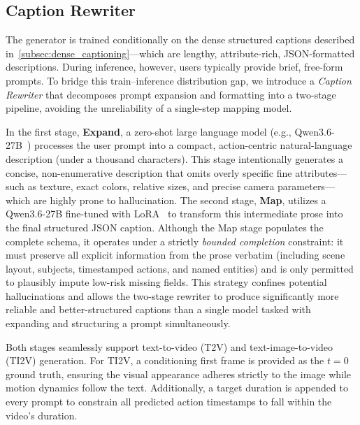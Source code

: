 \subsection{Caption Rewriter} \label{subsec:caption_rewriter}
The generator is trained conditionally on the dense structured captions described in~\cref{subsec:dense_captioning}---which are lengthy, attribute-rich, JSON-formatted descriptions. During inference, however, users typically provide brief, free-form prompts. To bridge this train--inference distribution gap, we introduce a \emph{Caption Rewriter} that decomposes prompt expansion and formatting into a two-stage pipeline, avoiding the unreliability of a single-step mapping model.

In the first stage, \textbf{Expand}, a zero-shot large language model (e.g., Qwen3.6-27B~\cite{qwen3.6-27b}) processes the user prompt into a compact, action-centric natural-language description (under a thousand characters). This stage intentionally generates a concise, non-enumerative description that omits overly specific fine attributes---such as texture, exact colors, relative sizes, and precise camera parameters---which are highly prone to hallucination. The second stage, \textbf{Map}, utilizes a Qwen3.6-27B fine-tuned with LoRA~\cite{hu2021lora} to transform this intermediate prose into the final structured JSON caption. Although the Map stage populates the complete schema, it operates under a strictly \emph{bounded completion} constraint: it must preserve all explicit information from the prose verbatim (including scene layout, subjects, timestamped actions, and named entities) and is only permitted to plausibly impute low-risk missing fields. This strategy confines potential hallucinations and allows the two-stage rewriter to produce significantly more reliable and better-structured captions than a single model tasked with expanding and structuring a prompt simultaneously.

Both stages seamlessly support text-to-video (T2V) and text-image-to-video (TI2V) generation. For TI2V, a conditioning first frame is provided as the $t{=}0$ ground truth, ensuring the visual appearance adheres strictly to the image while motion dynamics follow the text. Additionally, a target duration is appended to every prompt to constrain all predicted action timestamps to fall within the video's duration.

